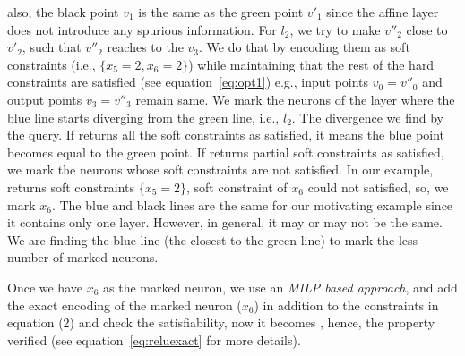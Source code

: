 also, the black point $v_1$ is the same as the green point $v'_1$ since the affine layer does not introduce any spurious information. 
For $l_2$, we try to make $v''_2$ close to $v'_2$, such that $v''_2$ reaches to the $v_3$. We do that by encoding 
them as soft constraints (i.e.,  $\{x_5=2, x_6=2\}$) 
while maintaining that the rest of the hard constraints are satisfied (see equation~\ref{eq:opt1})
e.g., input points $v_0=v''_0$ and output points $v_3=v''_3$ remain same. 
We mark the neurons of the layer where the blue line starts diverging from the green line, i.e., $l_2$. 
The divergence we find by the \maxsat{} query. If \maxsat{} returns all the soft constraints as satisfied, it means
the blue point becomes equal to the green point. If \maxsat{} returns partial soft constraints as satisfied, 
we mark the neurons whose soft constraints are not satisfied. In our example, \maxsat{} returns 
soft constraints $\{x_5=2\}$, soft constraint of $x_6$ could not satisfied, so, we mark $x_6$.
The blue and black lines are the same for our motivating example since it contains only one \relu{} layer. 
However, in general, it may or may not be the same. We are finding the blue line (the closest to the green line) to mark the 
less number of marked neurons. 




\noindent  
{}\;\;
  \begin{minipage}{0.42\linewidth}
Once we have  $x_6$ as the marked neuron, we use an {\em MILP based approach}, and add the exact encoding of the marked neuron ($x_6$) in addition to the constraints in equation (2) %
and check the satisfiability, now it becomes \unsat{}, hence, the property verified (see equation~\ref{eq:reluexact} for more details).
\end{minipage}

